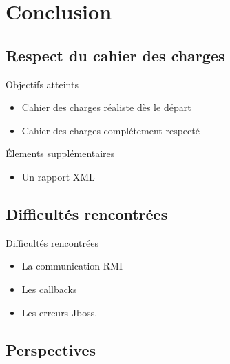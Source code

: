 \section{Conclusion}

\subsection{Respect du cahier des charges}

\begin{frame}[c]{\insertsubsection{}}
    \begin{block}{Objectifs atteints}
        \begin{itemize}
        \item Cahier des charges réaliste dès le départ
        \item Cahier des charges  complétement respecté
        \end{itemize}
    \end{block}
        \begin{block}{Élements supplémentaires}
        \begin{itemize}
        \item Un rapport XML
        \end{itemize}
    \end{block}
\end{frame}

\subsection{Difficultés rencontrées}

\begin{frame}[c]{\insertsubsection}
    \begin{block}{Difficultés rencontrées}
        \begin{itemize}
        \item La communication RMI
        \item Les callbacks
        \item Les erreurs Jboss.
        \end{itemize}
    \end{block}
\end{frame}

\subsection{Perspectives}

